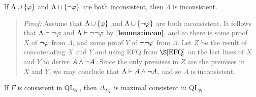 \begin{Lthm} \label{lemma:conin}
  If $\Lambda \cup \lbrace\varphi\rbrace$ and $\Lambda\cup \lbrace\neg\varphi\rbrace$ are both inconsistent, then $\Lambda$ is inconsistent. 
\end{Lthm}

\begin{quote} 
  \textit{Proof:} Assume that $\Lambda \cup \lbrace\varphi\rbrace$ and $\Lambda\cup \lbrace\neg\varphi\rbrace$ are both inconsistent.
  It follows that $\Lambda\vdash \neg\varphi$ and $\Lambda\vdash\neg\neg\varphi$ by \textbf{\ref{lemma:incon}}, and so there is some proof $X$ of $\neg\varphi$ from $\Lambda$, and some proof $Y$ of $\neg\neg\varphi$ from $\Lambda$. 
  Let $Z$ be the result of concatenating $X$ and $Y$ and using EFQ from $\S\ref{EFQ}$ on the last lines of $X$ and $Y$ to derive $A\wedge\neg A$. 
  Since the only premises in $Z$ are the premises in $X$ and $Y$, we may conclude that $\Lambda\vdash A\wedge\neg A$, and so $\Lambda$ is inconsistent. 
\end{quote}





\begin{Lthm} \label{lemma:max}
  If $\Gamma$ is consistent in QL$^=_{\mathbb{N}}$, then $\Delta_{\Sigma_\Gamma}$ is maximal consistent in QL$^=_{\mathbb{N}}$. 
\end{Lthm}

